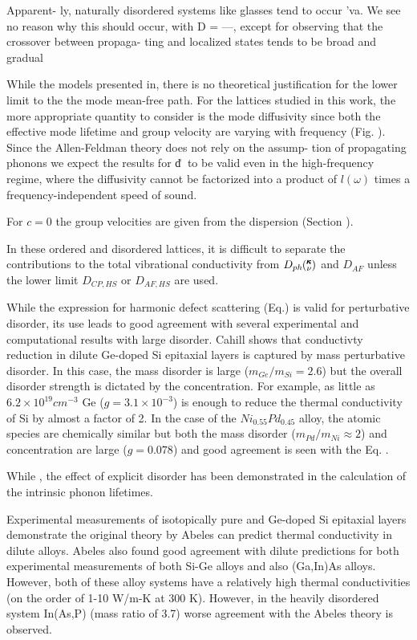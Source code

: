 \documentclass[aps,prb,onecolumn,preprint,superscriptaddress,amsmath,amssymb,floatfix]{revtex4}
\newcommand{\kv}{\mspace{-4.0mu}\left(\mspace{-8.0mu}
\begin{smallmatrix}&\pmb{\kappa} \\&\nu\end{smallmatrix}
\mspace{-3.0mu}\right)}
\begin{document}
Apparent-
ly, naturally disordered systems like glasses tend to occur
'va. We see no reason why this should occur,
with D = —,
except for observing that the crossover between propaga-
ting and localized states tends to be broad and gradual



While the models presented in, there is no theoretical justification for 
the lower limit to the the mode mean-free path.\cite{graebner_phonon_1986} 
For the lattices studied in this work, the more appropriate quantity to 
consider is the mode diffusivity since both the 
effective mode lifetime   
and group velocity are varying with frequency (Fig. ). 
Since the Allen-Feldman theory does not rely on the assump-
tion of propagating phonons we expect the results for d͑␻͒
to be valid even in the high-frequency regime, where the
diffusivity cannot be factorized into a product of $l(\omega)$ times
a frequency-independent speed of sound.


For $c=0$ the group velocities are given from the dispersion (Section ). 

In these ordered and disordered lattices, it is difficult to separate 
the contributions to the total vibrational 
conductivity from $D_{ph}\kv$ and $D_{AF}$ unless the lower limit 
$D_{CP,HS}$ or $D_{AF,HS}$ are used.  

While the
expression for harmonic defect scattering (Eq.) is valid for
perturbative disorder, its use leads to good agreement with
several experimental and computational results with large disorder.  
Cahill shows that conductivty reduction in dilute 
Ge-doped Si epitaxial layers 
is captured by mass perturbative disorder.\cite{cahill_thermal_2005} 
In this case, the mass disorder is large ($m_{Ge}/m_{Si} = 2.6$) 
but the overall disorder strength is dictated by the concentration. 
For example, as little as $6.2\times10^{19} cm^{-3}$ Ge
($g = 3.1\times10^{-3}$) is enough to reduce the thermal conductivity of 
Si by almost a factor of 2.\cite{cahill_thermal_2004}
In the
case of the $Ni_{0.55}Pd_{0.45}$ alloy, the atomic species
are chemically similar but both the mass disorder 
($m_{Pd}/m_{Ni} \approx 2$) and concentration are large ($g=0.078$) 
and good agreement is seen with the Eq. .
\cite{kamitakahara_vibrations_1974}

While , the effect of explicit disorder has been demonstrated in the 
calculation of the intrinsic phonon lifetimes.\cite{garg_role_2011}

Experimental measurements of isotopically pure and Ge-doped 
Si epitaxial layers demonstrate the original theory by Abeles can predict 
thermal conductivity in dilute alloys. Abeles also found good agreement 
with dilute predictions for both experimental measurements of both 
Si-Ge alloys and also (Ga,In)As alloys.\cite{abeles_lattice_1963} However, 
both of these alloy systems have a relatively high thermal conductivities 
(on the order of 1-10 W/m-K at 300 K). However, in the heavily disordered 
system In(As,P) (mass ratio of 3.7) worse agreement with the Abeles theory 
is observed. 
\end{document}
